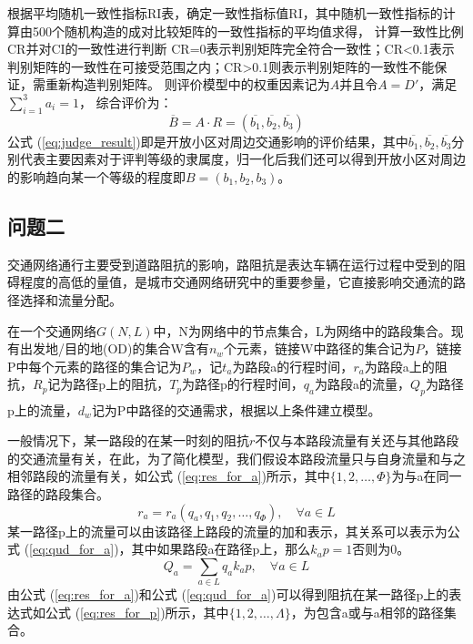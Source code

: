 \documentclass[fontset=windows,a4paper,12pt]{ctexart}
\newcommand{\upcite}[1]{\textsuperscript{\textsuperscript{\cite{#1}}}}
\renewcommand{\eqref}[1]{公式 (\ref{#1})}
\begin{document}
			根据平均随机一致性指标RI表，确定一致性指标值RI，其中随机一致性指标的计算由500个随机构造的成对比较矩阵的一致性指标的平均值求得，
			计算一致性比例CR并对CI的一致性进行判断
			CR=0表示判别矩阵完全符合一致性；CR<0.1表示判别矩阵的一致性在可接受范围之内；CR>0.1则表示判别矩阵的一致性不能保证，需重新构造判别矩阵。
			则评价模型中的权重因素记为$A$并且令$ A=D' $，满足$ \sum\limits_{i=1}^{3}a_i=1 $，
			综合评价为：
			\begin{equation}
				\overline{B}=A \cdot R=(\overline{b_1},\overline{b_2},\overline{b_3}) 
				\label{eq:judge_result}
			\end{equation}
			\eqref{eq:judge_result}即是开放小区对周边交通影响的评价结果，其中$\overline{b_1},\overline{b_2},\overline{b_3}$分
			别代表主要因素对于评判等级的隶属度，归一化后我们还可以得到开放小区对周边的影响趋向某一个等级的程度即$ B=(b_1,b_2,b_3) $。

	\subsection{问题二}
		交通网络通行主要受到道路阻抗的影响，路阻抗是表达车辆在运行过程中受到的阻碍程度的高低的量值，是城市交通网络研究中的重要参量，它直接影响交通流的路径选择和流量分配。
		
		在一个交通网络$G(N,L)$中，N为网络中的节点集合，L为网络中的路段集合。现有出发地/目的地(OD)的集合W含有$n_w$个元素，链接W中路径的集合记为$P$，链接P中每个元素的路径的集合记为$P_w$，记$t_a$为路段a的行程时间，$r_a$为路段a上的阻抗，$R_p$记为路径p上的阻抗，$T_p$为路径p的行程时间，$q_a$为路段a的流量，$Q_p$为路径p上的流量，$d_w$记为P中路径的交通需求，根据以上条件建立模型\upcite{赵春雪2012拥挤交通网络的}。
		
		一般情况下，某一路段的在某一时刻的阻抗$r$不仅与本路段流量有关还与其他路段的交通流量有关，在此，为了简化模型，我们假设本路段流量只与自身流量和与之相邻路段的流量有关，如\eqref{eq:res_for_a}所示，其中$\{1,2,\dots,\varPhi\}$为与a在同一路径的路段集合。
		\begin{equation}
			r_a=r_a(q_a,q_1,q_2,\dots,q_\varPhi),\quad\forall a \in L
			\label{eq:res_for_a}
		\end{equation}
		某一路径p上的流量可以由该路径上路段的流量的加和表示，其关系可以表示为\eqref{eq:qud_for_a}，其中如果路段a在路径p上，那么$k_ap=1$否则为0。
		\begin{equation}
			Q_a=\sum\limits_{a\in L}q_ak_ap,\quad\forall a \in L
			\label{eq:qud_for_a}
		\end{equation}
		由\eqref{eq:res_for_a}和\eqref{eq:qud_for_a}可以得到阻抗在某一路径p上的表达式如\eqref{eq:res_for_p}所示，其中$\{1,2,\dots,\Lambda\}$，为包含a或与a相邻的路径集合。
		
\end{document}
